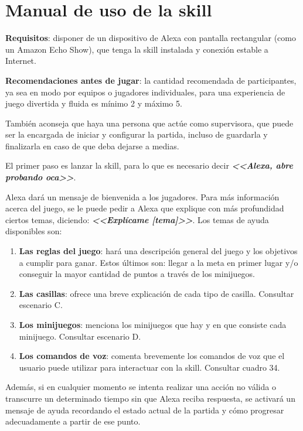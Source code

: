 \section{Manual de uso de la skill}


\textbf{Requisitos}: disponer de un dispositivo de Alexa con pantalla rectangular (como un Amazon Echo Show), que tenga la skill instalada y conexión estable a Internet.

\vspace{0.5cm}

\textbf{Recomendaciones antes de jugar}: la cantidad recomendada de participantes, ya sea en modo por equipos o jugadores individuales, para una experiencia de juego divertida y fluida es mínimo 2 y máximo 5. 

También aconseja que haya una persona que actúe como supervisora, que puede ser la encargada de iniciar y configurar la partida, incluso de guardarla y finalizarla en caso de que deba dejarse a medias.

\vspace{0.5cm}

El primer paso es lanzar la skill, para lo que es necesario decir \textbf{\textit{<<Alexa, abre probando oca>>}}.

Alexa dará un mensaje de bienvenida a los jugadores. Para más información acerca del juego, se le puede pedir a Alexa que explique con más profundidad ciertos temas, diciendo: \textbf{\textit{<<Explícame [tema]>>}}. Los temas de ayuda disponibles son: 
\begin{enumerate}
	\item \textbf{Las reglas del juego}: hará una descripción general del juego y los objetivos a cumplir para ganar. Estos últimos son: llegar a la meta en primer lugar y/o conseguir la mayor cantidad de puntos a través de los minijuegos.
	\item \textbf{Las casillas}: ofrece una breve explicación de cada tipo de casilla. Consultar escenario C.
	\item \textbf{Los minijuegos}: menciona los minijuegos que hay y en que consiste cada minijuego. Consultar escenario D.
	\item \textbf{Los comandos de voz}: comenta brevemente los comandos de voz que el usuario puede utilizar para interactuar con la skill. Consultar cuadro 34.
\end{enumerate}

Además, si en cualquier momento se intenta realizar una acción no válida o transcurre un determinado tiempo sin que Alexa reciba respuesta, se activará un mensaje de ayuda recordando el estado actual de la partida y cómo progresar adecuadamente a partir de ese punto.

